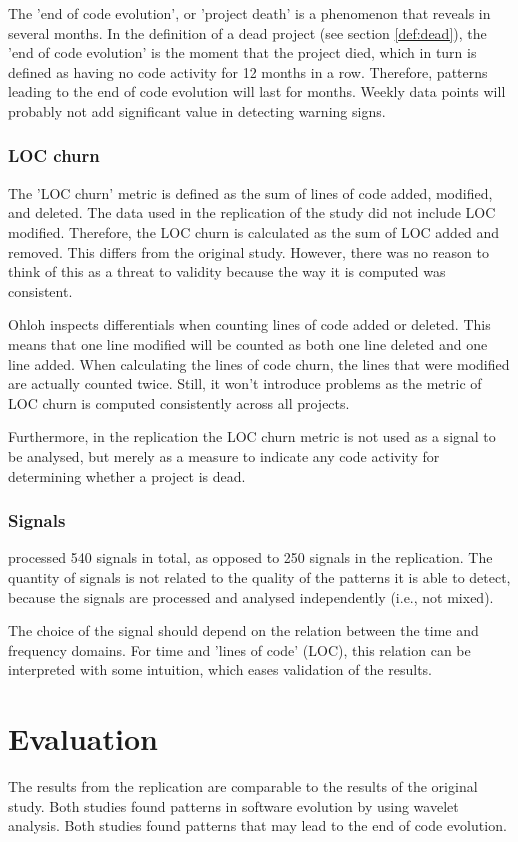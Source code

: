 The 'end of code evolution', or 'project death' is a phenomenon that reveals in
several months. In the definition of a dead project (see section
\ref{def:dead}), the 'end of code evolution' is the moment that the project
died, which in turn is defined as having no code activity for 12 months in a
row. Therefore, patterns leading to the end of code evolution will last for
months. Weekly data points will probably not add significant value in detecting
warning signs.

\subsubsection*{LOC churn}
The 'LOC churn' metric is defined as the sum of lines of code added, modified,
and deleted. The data used in the replication of the study did not include LOC
modified. Therefore, the LOC churn is calculated as the sum of LOC added and
removed. This differs from the original study. However, there was no reason to
think of this as a threat to validity because the way it is computed was
consistent.

Ohloh inspects differentials when counting lines of code added or deleted. This
means that one line modified will be counted as both one line deleted and one
line added. When calculating the lines of code churn, the lines that were
modified are actually counted twice. Still, it won't introduce problems as the
metric of LOC churn is computed consistently across all projects.

Furthermore, in the replication the LOC churn metric is not used as a signal to
be analysed, but merely as a measure to indicate any code activity for
determining whether a project is dead.

\subsubsection*{Signals}
\citeauthor{karus2013} processed 540 signals in total, as opposed to 250
signals in the replication. The quantity of signals is not related to the
quality of the patterns it is able to detect, because the signals are
processed and analysed independently (i.e., not mixed).

The choice of the signal should depend on the relation between the time and
frequency domains. For time and 'lines of code' (LOC), this relation can be
interpreted with some intuition, which eases validation of the results.

\section*{Evaluation}
The results from the replication are comparable to the results of the original
study. Both studies found patterns in software evolution by using wavelet
analysis. Both studies found patterns that may lead to the end of code
evolution.

